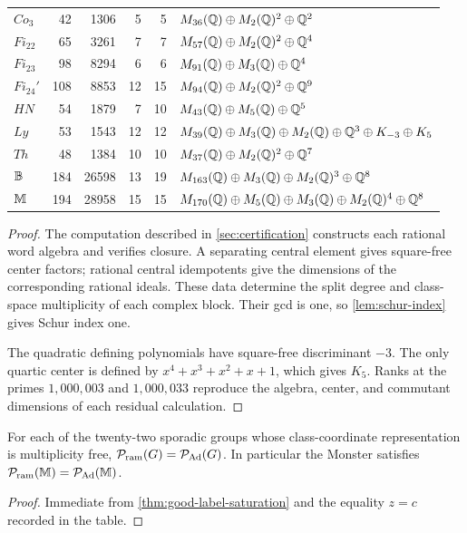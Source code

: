\begin{theorem}
\begin{longtable}{@{}lrrrrp{}@{}}
$Co_3$ & 42 & 1306 & 5 & 5 & $M_{36}(\mathbb Q)\oplus M_2(\mathbb Q)^2\oplus\mathbb Q^2$\\
$Fi_{22}$ & 65 & 3261 & 7 & 7 & $M_{57}(\mathbb Q)\oplus M_2(\mathbb Q)^2\oplus\mathbb Q^4$\\
$Fi_{23}$ & 98 & 8294 & 6 & 6 & $M_{91}(\mathbb Q)\oplus M_3(\mathbb Q)\oplus\mathbb Q^4$\\
$Fi_{24}'$ & 108 & 8853 & 12 & 15 & $M_{94}(\mathbb Q)\oplus M_2(\mathbb Q)^2\oplus\mathbb Q^9$\\
$HN$ & 54 & 1879 & 7 & 10 & $M_{43}(\mathbb Q)\oplus M_5(\mathbb Q)\oplus\mathbb Q^5$\\
$Ly$ & 53 & 1543 & 12 & 12 &
$M_{39}(\mathbb Q)\oplus M_3(\mathbb Q)\oplus M_2(\mathbb Q)\oplus\mathbb Q^3\oplus K_{-3}\oplus K_5$\\
$Th$ & 48 & 1384 & 10 & 10 & $M_{37}(\mathbb Q)\oplus M_2(\mathbb Q)^2\oplus\mathbb Q^7$\\
$\mathbb B$ & 184 & 26598 & 13 & 19 &
$M_{163}(\mathbb Q)\oplus M_3(\mathbb Q)\oplus M_2(\mathbb Q)^3\oplus\mathbb Q^8$\\
$\mathbb M$ & 194 & 28958 & 15 & 15 &
$M_{170}(\mathbb Q)\oplus M_5(\mathbb Q)\oplus M_3(\mathbb Q)\oplus M_2(\mathbb Q)^4\oplus\mathbb Q^8$\\
\bottomrule
\end{longtable}
\endgroup
\end{theorem}

\begin{proof}
The computation described in \cref{sec:certification} constructs each
rational word algebra and verifies closure.  A separating central element
gives square-free center factors; rational central idempotents give the
dimensions of the corresponding rational ideals.  These data determine the
split degree and class-space multiplicity of each complex block.  Their
gcd is one, so \cref{lem:schur-index} gives Schur
index one.

The quadratic defining polynomials have square-free discriminant $-3$.  The
only quartic center is defined by
$x^4+x^3+x^2+x+1$, which gives $K_5$.  Ranks at the primes
$1{,}000{,}003$ and $1{,}000{,}033$ reproduce the algebra, center, and
commutant dimensions of each residual calculation.
\end{proof}

\begin{corollary}
\label{cor:sporadic-saturation}
For each of the twenty-two sporadic groups whose class-coordinate
representation is multiplicity free, \(\mathcal P_{\mathrm{ram}}(G)=\mathcal P_{\mathrm{Ad}}(G)\).  In particular the
Monster satisfies \(\mathcal P_{\mathrm{ram}}(\mathbb M)=\mathcal P_{\mathrm{Ad}}(\mathbb M)\).
\end{corollary}

\begin{proof}
Immediate from \cref{thm:good-label-saturation} and the equality \(z=c\)
recorded in the table.
\end{proof}


